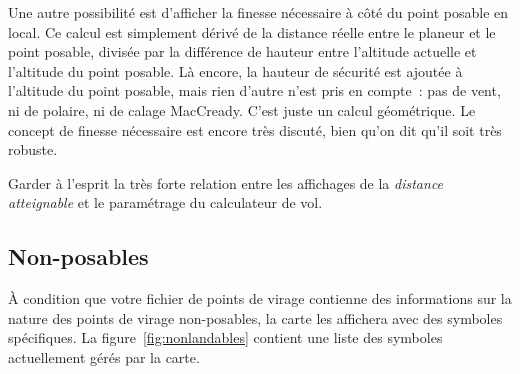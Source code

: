 Une autre possibilité est d'afficher la finesse nécessaire à côté
du point posable en local. Ce calcul est simplement dérivé de la
distance réelle entre le planeur et le point posable,
divisée par la différence de hauteur entre l'altitude actuelle et
l'altitude du point posable. Là encore, la hauteur de sécurité
est ajoutée à l'altitude du point posable, mais rien d'autre
n'est pris en compte~: pas de vent, ni de polaire, ni de calage
MacCready. C'est juste un calcul géométrique.
Le concept de finesse nécessaire est encore très discuté,
bien qu'on dit qu'il soit très robuste.

\tip Garder à l'esprit la très forte relation entre les affichages de la \emph{distance atteignable} et le paramétrage du calculateur de vol.

\subsection*{Non-posables}
À condition que votre fichier de points de virage contienne des informations sur la nature
des points de virage non-posables, la carte les affichera avec des symboles spécifiques.
La figure~\ref{fig:nonlandables} contient une liste des symboles actuellement gérés par la carte.

